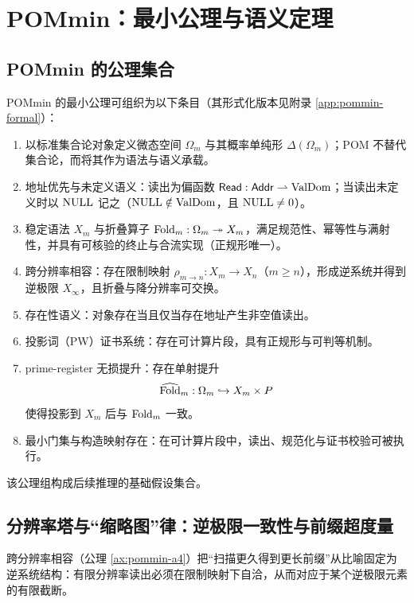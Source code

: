 \section{POMmin：最小公理与语义定理}\label{sec:pommin}

\subsection{POMmin 的公理集合}
POMmin 的最小公理可组织为以下条目（其形式化版本见附录 \ref{app:pommin-formal}）：
\begin{enumerate}[label=(A\arabic*), ref=A\arabic*]
  \item \label{ax:pommin-a1}
  以标准集合论对象定义微态空间 $\Omega_m$ 与其概率单纯形 $\Delta(\Omega_m)$；POM 不替代集合论，而将其作为语法与语义承载。

  \item \label{ax:pommin-a2}
  地址优先与未定义语义：读出为偏函数 $\mathsf{Read}:\mathsf{Addr}\rightharpoonup \mathrm{ValDom}$；当读出未定义时以 $\mathrm{NULL}$ 记之（$\mathrm{NULL}\notin\mathrm{ValDom}$，且 $\mathrm{NULL}\neq 0$）。

  \item \label{ax:pommin-a3}
  稳定语法 $X_m$ 与折叠算子 $\mathrm{Fold}_m:\Omega_m\twoheadrightarrow X_m$，满足规范性、幂等性与满射性，并具有可核验的终止与合流实现（正规形唯一）。

  \item \label{ax:pommin-a4}
  跨分辨率相容：存在限制映射 $\rho_{m\to n}:X_m\to X_n$（$m\ge n$），形成逆系统并得到逆极限 $X_\infty$，且折叠与降分辨率可交换。

  \item \label{ax:pommin-a5}
  存在性语义：对象存在当且仅当存在地址产生非空值读出。

  \item \label{ax:pommin-a6}
  投影词（PW）证书系统：存在可计算片段，具有正规形与可判等机制。

  \item \label{ax:pommin-a7}
  prime-register 无损提升：存在单射提升
  $$
  \widehat{\mathrm{Fold}}_m:\Omega_m\hookrightarrow X_m\times P
  $$
  使得投影到 $X_m$ 后与 $\mathrm{Fold}_m$ 一致。

  \item \label{ax:pommin-a8}
  最小门集与构造映射存在：在可计算片段中，读出、规范化与证书校验可被执行。
\end{enumerate}
该公理组构成后续推理的基础假设集合。

\subsection{分辨率塔与“缩略图”律：逆极限一致性与前缀超度量}\label{subsec:thumbnail-inverselimit}
跨分辨率相容（公理 \ref{ax:pommin-a4}）把“扫描更久得到更长前缀”从比喻固定为逆系统结构：有限分辨率读出必须在限制映射下自洽，从而对应于某个逆极限元素的有限截断。\par

